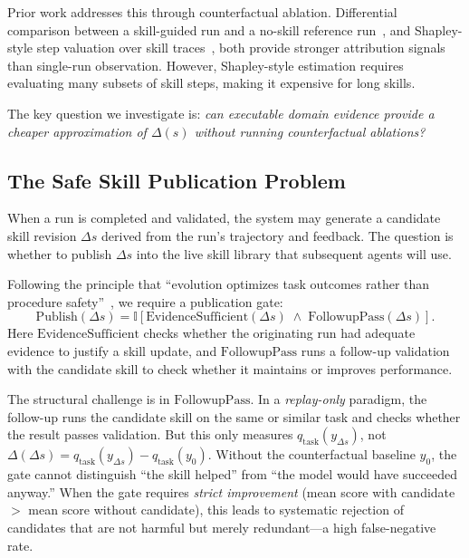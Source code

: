 ﻿\documentclass[preprint,12pt]{elsarticle}
\begin{document}
Prior work addresses this through counterfactual ablation.  Differential
comparison between a skill-guided run and a no-skill reference
run~\cite{skillharmful}, and Shapley-style step valuation over skill
traces~\cite{skillshapley,shapley}, both provide stronger attribution
signals than single-run observation.  However, Shapley-style estimation
requires evaluating many subsets of skill steps, making it expensive for
long skills.

The key question we investigate is: \emph{can executable domain evidence
provide a cheaper approximation of $\Delta(s)$ without running
counterfactual ablations?}

\subsection{The Safe Skill Publication Problem}
\label{sec:publication_problem}

When a run is completed and validated, the system may generate a candidate
skill revision $\Delta s$ derived from the run's trajectory and feedback.
The question is whether to publish $\Delta s$ into the live skill library
that subsequent agents will use.

Following the principle that ``evolution optimizes task outcomes rather
than procedure safety''~\cite{misevolution}, we require a publication gate:
\begin{equation}
    \mathrm{Publish}(\Delta s) =
    \mathbb{I}\left[
      \mathrm{EvidenceSufficient}(\Delta s)
      \;\land\;
      \mathrm{FollowupPass}(\Delta s)
    \right].
    \label{eq:gate}
\end{equation}
Here $\mathrm{EvidenceSufficient}$ checks whether the originating run had
adequate evidence to justify a skill update, and $\mathrm{FollowupPass}$
runs a follow-up validation with the candidate skill to check whether it
maintains or improves performance.

The structural challenge is in $\mathrm{FollowupPass}$.  In a
\emph{replay-only} paradigm, the follow-up runs the candidate skill on the
same or similar task and checks whether the result passes validation.  But
this only measures $q_{\mathrm{task}}(y_{\Delta s})$, not
$\Delta(\Delta s) = q_{\mathrm{task}}(y_{\Delta s}) -
q_{\mathrm{task}}(y_0)$.  Without the counterfactual baseline $y_0$, the
gate cannot distinguish ``the skill helped'' from ``the model would have
succeeded anyway.''  When the gate requires \emph{strict improvement}
(mean score with candidate $>$ mean score without candidate), this leads to
systematic rejection of candidates that are not harmful but merely
redundant---a high false-negative rate.
\end{document}
